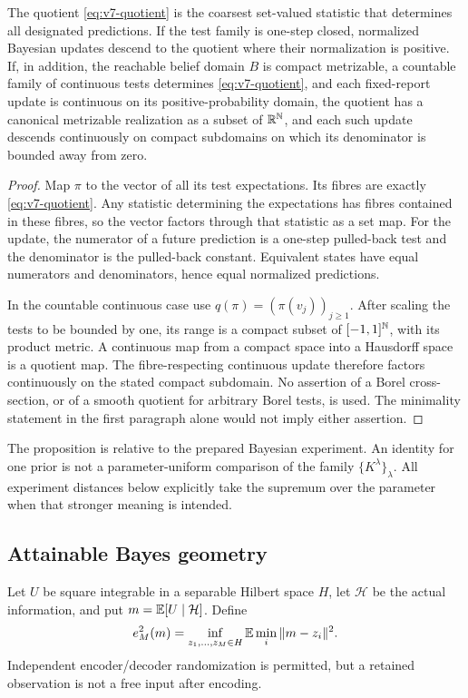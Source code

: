\begin{proposition}\label{prop:v7-quotient}
The quotient \eqref{eq:v7-quotient} is the coarsest set-valued statistic
that determines all designated predictions. If the test family is
one-step closed, normalized Bayesian updates descend to the quotient
where their normalization is positive. If, in addition, the reachable
belief domain $B$ is compact metrizable, a countable family of continuous
tests determines \eqref{eq:v7-quotient}, and each fixed-report update is
continuous on its positive-probability domain, the quotient has a
canonical metrizable realization as a subset of $\mathbb R^{\mathbb N}$, and each such
update descends continuously on compact subdomains on which its
denominator is bounded away from zero.
\end{proposition}
\begin{proof}
Map $\pi$ to the vector of all its test expectations. Its fibres are
exactly \eqref{eq:v7-quotient}. Any statistic determining the expectations
has fibres contained in these fibres, so the vector factors through that
statistic as a set map. For the update, the numerator of a future
prediction is a one-step pulled-back test and the denominator is the
pulled-back constant. Equivalent states have equal numerators and
denominators, hence equal normalized predictions.

In the countable continuous case use
$q(\pi)=(\pi(v_j))_{j\ge1}$. After scaling the tests to be bounded by
one, its range is a compact subset of $[-1,1]^{\mathbb N}$, with its product
metric. A continuous map from a compact space into a Hausdorff space is
a quotient map. The fibre-respecting continuous update therefore
factors continuously on the stated compact subdomain. No assertion of a
Borel cross-section, or of a smooth quotient for arbitrary Borel tests,
is used. The minimality statement in the first paragraph alone would
not imply either assertion.
\end{proof}

The proposition is relative to the prepared Bayesian experiment. An
identity for one prior is not a parameter-uniform comparison of the
family $\{K^\lambda\}_\lambda$. All experiment distances below explicitly
take the supremum over the parameter when that stronger meaning is
intended.

\subsection{Attainable Bayes geometry}
Let $U$ be square integrable in a separable Hilbert space $H$, let
$\mathcal H$ be the actual information, and put
$m=\mathbb E[U\mid\mathcal H]$. Define
\[
 e_M^2(m)=\inf_{z_1,\ldots,z_M\in H}
                \mathbb E\min_i\|m-z_i\|^2.
\]
Independent encoder/decoder randomization is permitted, but a retained
observation is not a free input after encoding.

